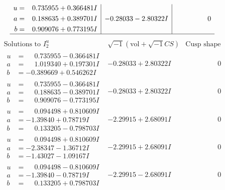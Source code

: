 \documentclass[1p]{elsarticle_modified}
\theoremstyle{definition}
\newcommand{\I}{\sqrt{-1}}
\begin{document}
$$\begin{array}{c|c|c}
\begin{aligned}
u &= \phantom{-}0.735955 + 0.366481 I \\
a &= \phantom{-}0.188635 + 0.389701 I \\
b &= \phantom{-}0.909076 + 0.773195 I\end{aligned}
 & -0.28033 - 2.80322 I & \phantom{-0.000000 } 0\\
 \hline 
 \end{array}$$\newpage$$\begin{array}{c|c|c}  
\text{Solutions to }I^u_{2}& \I (\text{vol} + \sqrt{-1}CS) & \text{Cusp shape}\\
 \hline 
\begin{aligned}
u &= \phantom{-}0.735955 - 0.366481 I \\
a &= \phantom{-}1.019340 + 0.197301 I \\
b &= -0.389669 + 0.546262 I\end{aligned}
 & -0.28033 + 2.80322 I & \phantom{-0.000000 } 0 \\ \hline\begin{aligned}
u &= \phantom{-}0.735955 - 0.366481 I \\
a &= \phantom{-}0.188635 - 0.389701 I \\
b &= \phantom{-}0.909076 - 0.773195 I\end{aligned}
 & -0.28033 + 2.80322 I & \phantom{-0.000000 } 0 \\ \hline\begin{aligned}
u &= \phantom{-}0.094498 + 0.810609 I \\
a &= -1.39840 + 0.78719 I \\
b &= \phantom{-}0.133205 - 0.798703 I\end{aligned}
 & -2.29915 + 2.68091 I & \phantom{-0.000000 } 0 \\ \hline\begin{aligned}
u &= \phantom{-}0.094498 + 0.810609 I \\
a &= -2.38347 - 1.36712 I \\
b &= -1.43027 - 1.09167 I\end{aligned}
 & -2.29915 + 2.68091 I & \phantom{-0.000000 } 0 \\ \hline\begin{aligned}
u &= \phantom{-}0.094498 - 0.810609 I \\
a &= -1.39840 - 0.78719 I \\
b &= \phantom{-}0.133205 + 0.798703 I\end{aligned}
 & -2.29915 - 2.68091 I & \phantom{-0.000000 } 0 \\ \hline\begin{aligned}

\end{aligned}
\end{array}$$
\end{document}
